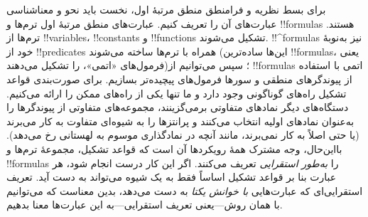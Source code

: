 \documentclass[../../../include/open-logic-section]{subfiles}
\begin{document}


برای بسط نظریه و فرامنطق منطق مرتبهٔ اول، نخست باید نحو و معناشناسی
عبارت‌های آن را تعریف کنیم. عبارت‌های منطق مرتبهٔ اول ترم‌ها و
!!{formula}s هستند. ترم‌ها از !!{variable}s، !!{constant}s و
!!{function}s تشکیل می‌شوند. !!^{formula}s نیز به‌نوبهٔ خود از
!!{predicate}s همراه با ترم‌ها ساخته می‌شوند (این‌ها ساده‌ترین
!!{formula}s، یعنی فرمول‌های «اتمی»، را تشکیل می‌دهند)؛ سپس می‌توانیم
از !!{formula}s اتمی با استفاده از پیوندگرهای منطقی و سورها فرمول‌های
پیچیده‌تر بسازیم. برای صورت‌بندی قواعد تشکیل راه‌های گوناگونی وجود دارد
و ما تنها یکی از راه‌های ممکن را ارائه می‌کنیم. دستگاه‌های دیگر نمادهای
متفاوتی برمی‌گزینند، مجموعه‌های متفاوتی از پیوندگرها را به‌عنوان نمادهای
اولیه انتخاب می‌کنند و پرانتزها را به شیوه‌ای متفاوت به کار می‌برند
(یا حتی اصلاً به کار نمی‌برند، مانند آنچه در نمادگذاری موسوم به لهستانی
رخ می‌دهد). بااین‌حال، وجه مشترک همهٔ رویکردها آن است که قواعد تشکیل،
مجموعهٔ ترم‌ها و !!{formula}s را \emph{به‌طور استقرایی} تعریف می‌کنند.
اگر این کار درست انجام شود، هر عبارت بنا بر قواعد تشکیل اساساً فقط به
یک شیوه می‌تواند به دست آید. تعریف استقرایی‌ای که عبارت‌هایی
\emph{با خوانش یکتا} به دست می‌دهد، بدین معناست که می‌توانیم با همان
روش---یعنی تعریف استقرایی---به این عبارت‌ها معنا بدهیم.
\end{document}
